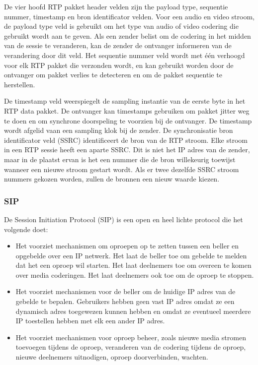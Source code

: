 \clearpage


\noindent De vier hoofd RTP pakket header velden zijn the payload type, sequentie nummer, timestamp en bron identificator velden. Voor een audio en video stroom, de payload type veld is gebruikt om het type van audio of video codering die gebruikt wordt aan te geven. Als een zender belist om de codering in het midden van de sessie te veranderen, kan de zender de ontvanger informeren van de verandering door dit veld. 
Het sequentie nummer veld wordt met één verhoogd voor elk RTP pakket die verzonden wordt, en kan gebruikt worden door de ontvanger om pakket verlies te detecteren en om de pakket sequentie te herstellen. 

\noindent De timestamp veld weerspiegelt de sampling instantie van de eerste byte in het RTP data pakket. De ontvanger kan timestamps gebruiken om pakket jitter weg te doen en om synchrone doorspeling te voorzien bij de ontvanger. De timestamp wordt afgelid vaan een sampling klok bij de zender.
De synchronisatie bron identificator veld (SSRC) identificeert de bron van de RTP stroom. Elke stroom in een RTP sessie heeft een aparte SSRC. Dit is niet het IP adres van de zender, maar in de plaatst ervan is het een nummer die de bron willekeurig toewijst wanneer een nieuwe stroom gestart wordt. Als er twee dezelfde SSRC stroom nummers gekozen worden, zullen de bronnen een nieuw waarde kiezen.

\subsubsection{SIP}

\noindent De Session Initiation Protocol (SIP) is een open en heel lichte protocol die het volgende doet:

\begin{itemize}
\item Het voorziet mechanismen om oproepen op te zetten tussen een beller en opgebelde over een IP netwerk. Het laat de beller toe om gebelde te melden dat het een oproep wil starten. Het laat deelnemers toe om overeen te komen over media coderingen. Het laat deelnemers ook toe om de oproep te stoppen.
\item Het voorziet mechanismen voor de beller om de huidige IP adres van de gebelde te bepalen. Gebruikers hebben geen vast IP adres omdat ze een dynamisch adres toegewezen kunnen hebben en omdat ze eventueel meerdere IP toestellen hebben met elk een ander IP adres.
\item Het voorziet mechanismen voor oproep beheer, zoals nieuwe media stromen toevoegen tijdens de oproep, veranderen van de codering tijdens de oproep, nieuwe deelnemers uitnodigen, oproep doorverbinden, wachten.
\end{itemize}

